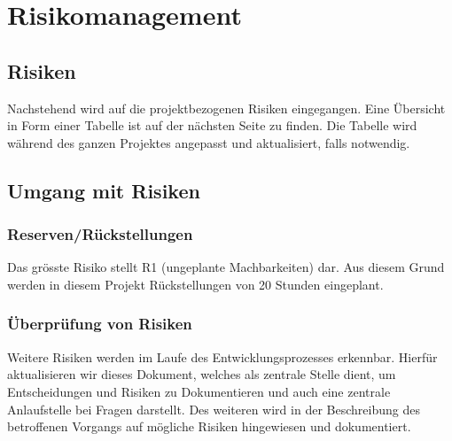 \section*{Risikomanagement}
	\subsection*{Risiken}
		Nachstehend wird auf die projektbezogenen Risiken eingegangen. Eine Übersicht in Form einer Tabelle ist 
		auf der nächsten Seite zu finden. Die Tabelle wird während des ganzen Projektes angepasst und aktualisiert, falls notwendig.

	\subsection*{Umgang mit Risiken}
		\subsubsection*{Reserven/Rückstellungen}
			Das grösste Risiko stellt R1 (ungeplante Machbarkeiten) dar. Aus diesem Grund werden in diesem Projekt Rückstellungen von 20 Stunden eingeplant.

		\subsubsection*{Überprüfung von Risiken}
			Weitere Risiken werden im Laufe des Entwicklungsprozesses erkennbar. Hierfür aktualisieren wir dieses Dokument, welches als zentrale Stelle dient, 
			um Entscheidungen und Risiken zu Dokumentieren und auch eine zentrale Anlaufstelle bei Fragen darstellt. Des weiteren wird in der Beschreibung des 
			betroffenen Vorgangs auf mögliche Risiken hingewiesen und dokumentiert.
\pagebreak
	
